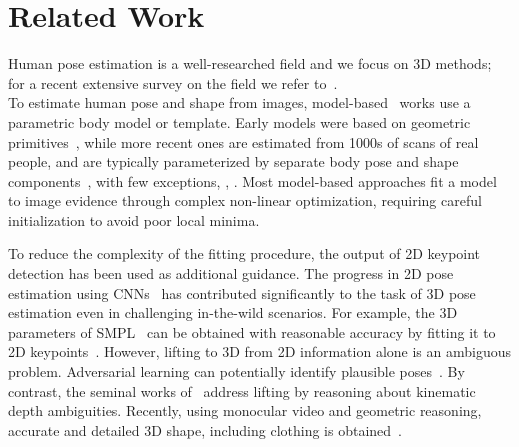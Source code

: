 \documentclass[10pt,twocolumn,letterpaper]{article}
\begin{document}
 \section{Related Work}
Human pose estimation is a well-researched field and we focus on 3D methods; for a recent extensive
survey on the field we refer to~\cite{sarafianos_posesurvey_cviu2016}.\\
 To estimate human pose and shape from images,
model-based~\cite{PonsModelBased} works use a parametric body model or template.
Early models were based on geometric
primitives~\cite{metaxas1993shape,gavrila1996,plankers2001articulated,sigal2004tracking,stoll2011fast},
while more recent 
ones are estimated from 1000s of scans of real people, and are typically parameterized by separate body pose and
shape components~\cite{anguelov2005scape,hasler2009statistical,smpl2015loper,zuffi2015stitched,pons2015dyna}, with few exceptions, \eg, \cite{joo2018total}.
Most model-based approaches fit a model to image evidence through complex non-linear optimization, requiring careful initialization to avoid poor local minima.

To reduce the complexity of the fitting procedure, the output of
2D keypoint detection has been used as additional guidance.
The progress in 2D pose
estimation using CNNs~\cite{CPM,cao2016realtime,insafutdinov17cvpr} has contributed
significantly to the task of 3D pose estimation even in challenging in-the-wild
scenarios.
For example, the 3D parameters of SMPL~\cite{smpl2015loper} can be obtained with
reasonable accuracy by fitting it to 2D
keypoints~\cite{bogo_smpl_eccv16,Lassner:UP:2017}. However, lifting to 3D from 2D
information alone is an ambiguous problem. Adversarial learning can potentially identify plausible poses~\cite{jack2017adversarially,hmrKanazawa17}.
By contrast, the seminal works of~\cite{taylor_articulated_cvpr00,sminchisescu2003kinematic} address lifting by reasoning about kinematic depth ambiguities. 
Recently, using monocular video and geometric reasoning, accurate and detailed 3D shape, including clothing is obtained~\cite{thiemo2018, thiemo2018_3DV}. 
\end{document}
